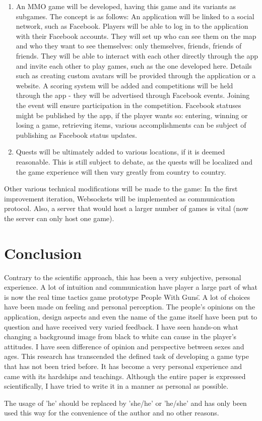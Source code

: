 \begin{enumerate}
  \item An MMO game will be developed, having this game and its variants as
  subgames. The concept is as follows: An application will be linked to a social
  network, such as Facebook. Players will be able to log in to the application
  with their Facebook accounts. They will set up who can see them on the map and
  who they want to see themselves: only themselves, friends, friends of friends.
  They will be able to interact with each other directly through the app and
  invite each other to play games, such as the one developed here. Details such
  as creating custom avatars will be provided through the application or a
  website. A scoring system will be added and competitions will be held through
  the app - they will be advertised through Facebook events. Joining the event
  will ensure participation in the competition. Facebook statuses might be
  published by the app, if the player wants so: entering, winning or losing a
  game, retrieving items, various accomplishments can be subject of publishing
  as Facebook status updates.
  
  \item Quests will be ultimately added to various locations, if it is deemed
  reasonable. This is still subject to debate, as the quests will be localized
  and the game experience will then vary greatly from country to country.  
  
\end{enumerate}

Other various technical modifications will be made to the game: In the first
improvement iteration, Websockets will be implemented as communication protocol.
Also, a server that would host a larger number of games is vital (now the
server can only host one game).



\section{Conclusion}


Contrary to the scientific approach, this has been a very subjective, personal
experience. A lot of intuition and communication have player a large part of
what is now the real time tactics game prototype \"People With Guns\" . A lot of
choices have been made on feeling and personal perception. The people's opinions
on the application, design aspects and even the name of the game itself have
been put to question and have received very varied feedback. I have seen
hands-on what changing a background image from black to white can cause in the
player's attitudes. I have seen difference of opinion and perspective between
sexes and ages. This research has transcended the defined task of developing a
game type that has not been tried before. It has become a very personal
experience and came with its hardships and teachings. Although the entire paper
is expressed scientifically, I have tried to write it in a manner as personal as
possible.\newline

The usage of 'he' should be replaced by 'she/he' or 'he/she' and has only been
used this way for the convenience of the author and no other reasons.
